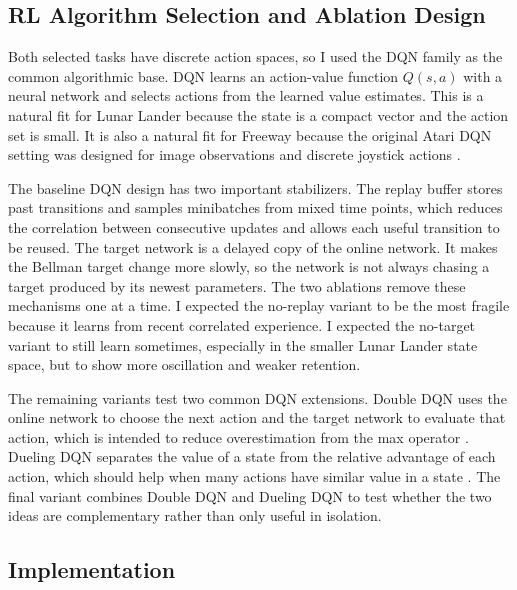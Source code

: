 \documentclass[12pt]{article}
\begin{document}
\begin{table}[t]
  \centering
  \caption{Selected tasks for the DQN ablation study.}
  \label{tab:task-selection}
  \small
  
\end{table}

\subsection{RL Algorithm Selection and Ablation Design}

Both selected tasks have discrete action spaces, so I used the DQN family as the common algorithmic base. DQN learns an action-value function $Q(s,a)$ with a neural network and selects actions from the learned value estimates. This is a natural fit for Lunar Lander because the state is a compact vector and the action set is small. It is also a natural fit for Freeway because the original Atari DQN setting was designed for image observations and discrete joystick actions \cite{mnih2015human}.

The baseline DQN design has two important stabilizers. The replay buffer stores past transitions and samples minibatches from mixed time points, which reduces the correlation between consecutive updates and allows each useful transition to be reused. The target network is a delayed copy of the online network. It makes the Bellman target change more slowly, so the network is not always chasing a target produced by its newest parameters. The two ablations remove these mechanisms one at a time. I expected the no-replay variant to be the most fragile because it learns from recent correlated experience. I expected the no-target variant to still learn sometimes, especially in the smaller Lunar Lander state space, but to show more oscillation and weaker retention.

The remaining variants test two common DQN extensions. Double DQN uses the online network to choose the next action and the target network to evaluate that action, which is intended to reduce overestimation from the max operator \cite{vanhasselt2016deep}. Dueling DQN separates the value of a state from the relative advantage of each action, which should help when many actions have similar value in a state \cite{wang2016dueling}. The final variant combines Double DQN and Dueling DQN to test whether the two ideas are complementary rather than only useful in isolation.

\subsection{Implementation}
\end{document}
